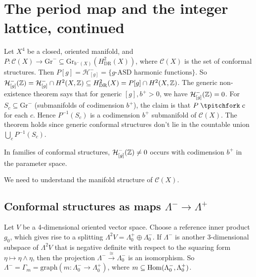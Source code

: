 \section{The period map and the integer lattice, continued} 
Let $X^4$ be a closed, oriented manifold, and $P \colon \mathcal C(X) \to \mathrm{Gr}^- \subseteq \mathrm{Gr}_{b^-(X)}(H^2_{\mathrm{DR}}(X))$, where $\mathcal C(X)$ is the set of conformal structures. Then $P[g] = \mathcal H^- _{[g]}= \{g\text{-ASD harmonic functions} \} $. So $\mathcal H_{[g]}^- (\mathbb{Z}) = \mathcal H^-_{[g]} \cap  H^2(X,\mathbb{Z}) \subseteq H^2 _{\mathrm{DR}}(X) = P[g] \cap H^2(X,\mathbb{Z})$. The generic non-existence theorem says that for generic $[g], b^+ >0$, we have  $\mathcal H ^- _{[g]}(\mathbb{Z}) = 0$.
For $S_c \subseteq \mathrm{Gr}^- $ (submanifolds of codimension $b^+$), the claim is that $P \transv c$ for each $c$. Hence $P^{-1}(S_c)$ is a codimension $b^+$ submanifold of $\mathcal C(X)$.
The theorem holds since generic conformal structures don't lie in the countable union $\bigcup_{c} P^{-1}(S_c)$.

\begin{remark}
    In families of conformal structures, $\mathcal H _{[g]}^- (\mathbb{Z}) \neq 0$ occurs with codimension $b^+$ in the parameter space.
\end{remark}
We need to understand the manifold structure of $\mathcal C(X)$. 

\subsection{Conformal structures as maps $\Lambda ^- \to \Lambda^+$}
Let $V$ be a 4-dimensional oriented vector space. Choose a reference inner product $g_0$, which gives rise to a splitting $\Lambda^2V = \Lambda_0^+ \oplus \Lambda_0^-$. If $\Lambda^-$ is another 3-dimensional subspace of $\Lambda^2V$ that is negative definite with respect to the squaring form $\eta \mapsto \eta \wedge \eta$, then the projection $\Lambda^- \xrightarrow{\cong} \Lambda_0^-$ is an isomorphism. So $\Lambda^- = \Gamma_ m = \mathrm{graph}\left(m \colon \Lambda_0^-  \to \Lambda_0^+\right)$, where $ m \subseteq \operatorname{Hom}(\Lambda_0^-, \Lambda_0^+)$.

